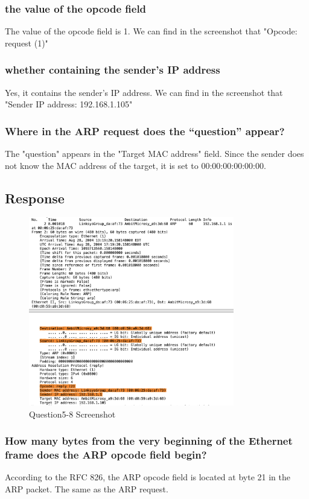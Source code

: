 \documentclass{article}
\begin{document}
\begin{CJK*}{UTF8}{gbsn}
\subsubsection{the value of the opcode field}
The value of the opcode field is 1. We can find
in the screenshot that "Opcode: request (1)"
\subsubsection{whether containing the sender's IP address}
Yes, it contains the sender's IP address. We can find
in the screenshot that "Sender IP address: 192.168.1.105"
\subsubsection{Where in the ARP request does the “question” appear?}
The "question" appears in the "Target MAC address" field.
Since the sender does not know the MAC address of the target, it is set to 00:00:00:00:00:00.

\subsection{Response}
\begin{figure}[H]
    \centering
    \includegraphics[width=0.8\textwidth]{14.png}
    \caption{Question5-8 Screenshot}
\end{figure}
\subsubsection{How many bytes from the very beginning of the Ethernet frame does the ARP opcode field begin?}
According to the RFC 826,
the ARP opcode field is located at byte 21 in the ARP packet. The same as the ARP request.

\end{CJK*}
\end{document}
